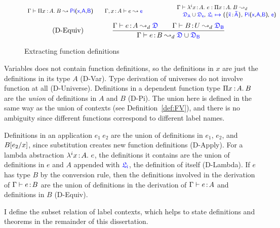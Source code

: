 \begin{figure}
\begin{equation}
{{\begin{array}{l @{\qquad} l}
			   \Gamma \vdash \pitype{x}{A}{B} \leadsto \targetpi{x}{A}{B} &
			   \Gamma, x \goodcolon A \vdash e \leadsto \target{e}\\
        	\end{array}}}
			{\begin{array}{c}
			 \Gamma \vdash \lami{i}{x}{A}{e} \mathrel{:} \pitype{x}{A}{B} \leadsto_d \\
			  \qquad \qquad \qquad \target{\fdef_A} \cup \target{\fdef_e} \sfcomma \itemdef{\target{\flabel_i}}{\itemtype{\bar{x}}{\bar{A}}}{\targetpi{x}{A}{B}}{\target{e}}
			 \end{array}
			}
	\end{equation} \vspace{0.5cm}
	\begin{equation}
		\tag{D-Equiv}
		\qquad\qquad
		\frac
			{\Gamma \vdash e \goodcolon A \leadsto_d \target{\fdef} \qquad \Gamma \vdash B \goodcolon U \leadsto_d \target{\fdef_B}}
			{\Gamma \vdash e \goodcolon B \leadsto_d \target{\fdef} \cup \target{\fdef_B}}
	\end{equation}
	\caption{Extracting function definitions}
    \label{fig:dcc def}
\end{figure}

Variables does not contain function definitions, so the definitions in $x$ are just the definitions in its type $A$ (D-Var). Type derivation of universes do not involve function at all (D-Universe). Definitions in a dependent function type $\Pi x\mkern1.5mu{\hspace{0.5mm}{:}\hspace{0.5mm}} A.\hspace{0.8mm}B$ are the \textit{union} of definitions in $A$ and $B$ (D-Pi). The union here is defined in the same way as the union of contexts (see Definition~\ref{def:FV}), and there is no ambiguity since different functions correspond to different label names.

Definitions in an application $e_1\ e_2$ are the union of definitions in $e_1$, $e_2$, and $B[e_2\slash x]$, since substitution creates new function definitions (D-Apply). For a lambda abstraction $\lambda^{i}x\hspace{0.5mm}{:}\hspace{0.5mm} A.\ e$, the definitions it contains are the union of definitions in $e$ and $A$ appended with $\target{\flabel_i}$, the definition of itself (D-Lambda).
If $e$ has type $B$ by the conversion rule, then the definitions involved in the derivation of $\Gamma \vdash e \hspace{0.5mm}{:}\hspace{0.5mm} B$ are the union of definitions in the derivation of $\Gamma \vdash e \hspace{0.5mm}{:}\hspace{0.5mm} A$ and definitions in $B$ (D-Equiv).

I define the subset relation of label contexts, which helps to state definitions and theorems in the remainder of this dissertation.

